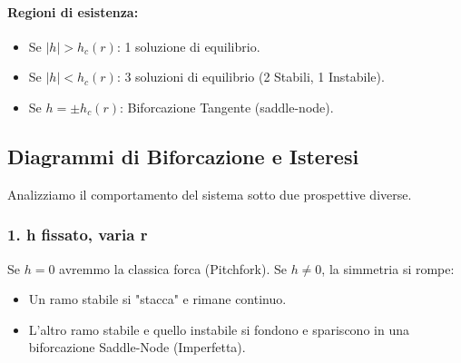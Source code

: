 \documentclass[openany]{book}
\theoremstyle{definition}
\theoremstyle{remark}
\begin{document}
\paragraph{Regioni di esistenza:}
\begin{itemize}
    \item Se $|h| > h_c(r)$: 1 soluzione di equilibrio.
    \item Se $|h| < h_c(r)$: 3 soluzioni di equilibrio (2 Stabili, 1 Instabile).
    \item Se $h = \pm h_c(r)$: Biforcazione Tangente (saddle-node).
\end{itemize}

\begin{center}
\end{center}

\subsection{Diagrammi di Biforcazione e Isteresi}

Analizziamo il comportamento del sistema sotto due prospettive diverse.

\subsubsection*{1. h fissato, varia r}
Se $h=0$ avremmo la classica forca (Pitchfork).
Se $h \neq 0$, la simmetria si rompe:
\begin{itemize}
    \item Un ramo stabile si "stacca" e rimane continuo.
    \item L'altro ramo stabile e quello instabile si fondono e spariscono in una biforcazione Saddle-Node (Imperfetta).
\end{itemize}
\end{document}
